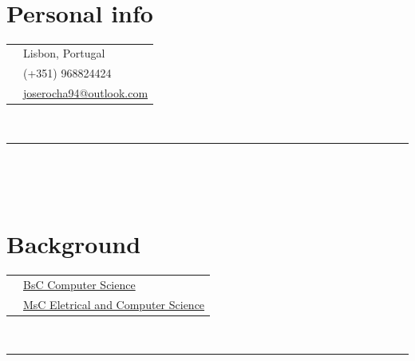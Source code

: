 \documentclass[oneside]{article}
\begin{document}
{\begin{minipage}[t][\textheight-2\fboxsep-2\fboxrule][t]{\dimexpr0.4\textwidth-2\fboxrule-2\fboxsep\relax}
        \vspace{0.3 cm} \\
        \section*{\normalsize Personal info}
        \begin{tabularx}{\textwidth}{cY}
            \faMapMarker{} & \small  Lisbon, Portugal \\
            \faPhone{} & \small  (+351) 968824424 \\
            \faEnvelope{} & \small \href{mailto:joserocha94@outlook.com}{joserocha94@outlook.com} \\
        \end{tabularx}
        \vspace{0.5cm} \\
        \rule{\linewidth}{0.4pt} \\

        \vspace{0.3 cm} \\
        \section*{\normalsize Background}
        \begin{tabular}{cl}
            \faUniversity{} & \small \href{https://www.uevora.pt/}{BsC Computer Science} \\
            \faUniversity{} & \small \href{https://tecnico.ulisboa.pt/pt/}{MsC Eletrical and Computer Science}\\ 
        \end{tabular}
        \vspace{0.5cm} \\
        \rule{\linewidth}{0.4pt} \\

        \vspace{0.3 cm} \\

\end{minipage}}
\end{document}
